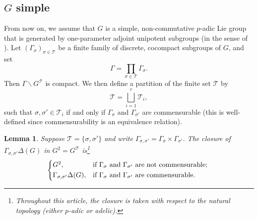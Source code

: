\documentclass[11pt,oneside,reqno]{amsart}
\newcommand{\Tcal}{\mathcal{T}}
\theoremstyle{plain}
\newtheorem{lemma}[theorem]{Lemma}
\begin{document}
	\subsection{$G$ simple}\label{G simple}
	From now on, we assume that $G$ is a simple, non-commutative $p$-adic Lie group that is generated by one-parameter adjoint unipotent subgroups
	(in the sense of \cite{Ratner1995}). Let $(\Gamma_{\sigma})_{\sigma\in\mathcal{T}}$ be a finite family of discrete, cocompact subgroups of $G$, and set
	\[
	\Gamma=\prod_{\sigma\in\mathcal{T}}\Gamma_{\sigma}.
	\]
	Then $\Gamma\backslash G^{\mathcal{T}}$ is compact.
	We then define a partition of the finite set $\mathcal{T}$ by
	\begin{equation}\label{partition of T}
		\mathcal{T}=\bigsqcup_{i=1}^r\mathcal{T}_i,
	\end{equation}
	such that $\sigma,\sigma'\in\mathcal{T}_i$ if and only if $\Gamma_{\sigma}$ and $\Gamma_{\sigma'}$ are commensurable (this is well-defined since commensurability is an equivalence relation).
	\begin{lemma}\label{closure of diagonal image depending on commensurability}
		Suppose $\Tcal=\{\sigma,\sigma'\}$ and write $\Gamma_{\sigma,\sigma'}=\Gamma_{\sigma}\times\Gamma_{\sigma'}$. The closure of $\Gamma_{\sigma,\sigma'}\Delta(G)$ in $G^2=G^\Tcal$ is\footnote{Throughout this article, the closure is taken with respect to the natural topology (either $p$-adic or adelic).}
		\[
		\begin{cases*}
			G^2,
			&
			if $\Gamma_{\sigma}$ and $\Gamma_{\sigma'}$ are not commensurable;
			\\
			\Gamma_{\sigma,\sigma'}\Delta(G),
			&
			if $\Gamma_{\sigma}$ and $\Gamma_{\sigma'}$ are commensurable.
		\end{cases*}
		\]
	\end{lemma}
\end{document}
